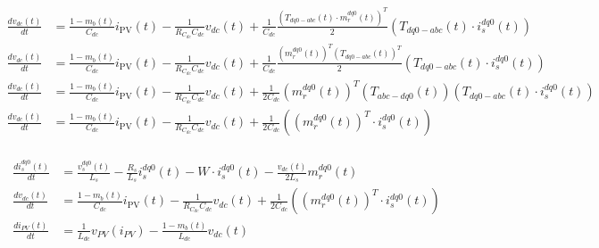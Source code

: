 \documentclass[11pt, a4paper]{article}
\newcommand{\der}[1]{\frac{d #1(t)}{dt}}
\begin{document}
\begin{align*}
    \der{v_{dc}}&=\frac{1-m_b(t)}{C_{dc}}i_{\text{PV}}(t)-\frac{1}{R_{C_{dc}}C_{dc}}v_{dc}(t)+\frac{1}{C_{dc}}\frac{(T_{dq0-abc}(t)\cdot m_r^{dq0}(t))^T}{2}\left(T_{dq0-abc}(t)\cdot i_s^{dq0}(t)\right) \\[12pt]
    \der{v_{dc}}&=\frac{1-m_b(t)}{C_{dc}}i_{\text{PV}}(t)-\frac{1}{R_{C_{dc}}C_{dc}}v_{dc}(t)+\frac{1}{C_{dc}}\frac{({m_r^{dq0}(t)})^T ({T_{dq0-abc}(t)})^T}{2}\left(T_{dq0-abc}(t)\cdot i_s^{dq0}(t)\right)   \\[12pt]
    \der{v_{dc}}&=\frac{1-m_b(t)}{C_{dc}}i_{\text{PV}}(t)-\frac{1}{R_{C_{dc}}C_{dc}}v_{dc}(t)+\frac{1}{2 C_{dc}}({m_r^{dq0}(t)})^T ({T_{abc-dq0}(t)})\left(T_{dq0-abc}(t) \cdot i_s^{dq0}(t)\right)   \\[12pt]
    \der{v_{dc}}&=\frac{1-m_b(t)}{C_{dc}}i_{\text{PV}}(t)-\frac{1}{R_{C_{dc}}C_{dc}}v_{dc}(t)+\frac{1}{2 C_{dc}}\left(({m_r^{dq0}(t)})^T \cdot i_s^{dq0}(t) \right) \\[12pt]
\end{align*}

\begin{align*}
    \der{i_s^{dq0}} &= \frac{v_s^{dq0}(t)}{L_s}-\frac{R_s}{L_s}i_s^{dq0}(t)- W\cdot i_s^{dq0}(t)-\frac{v_{dc}(t)}{2L_s}m_r^{dq0}(t) \\[12pt]
    \der{v_{dc}}&=\frac{1-m_b(t)}{C_{dc}}i_{\text{PV}}(t)-\frac{1}{R_{C_{dc}}C_{dc}}v_{dc}(t)+\frac{1}{2 C_{dc}}\left(({m_r^{dq0}(t)})^T \cdot i_s^{dq0}(t) \right) \\[12pt] 
    \frac{d i_{PV}(t)}{d t} &= \frac{1}{L_{dc}} v_{PV}(i_{PV}) - \frac{1 - m_{b}(t)}{L_{dc}} v_{dc}(t) \\[12pt]
\end{align*}
\end{document}
